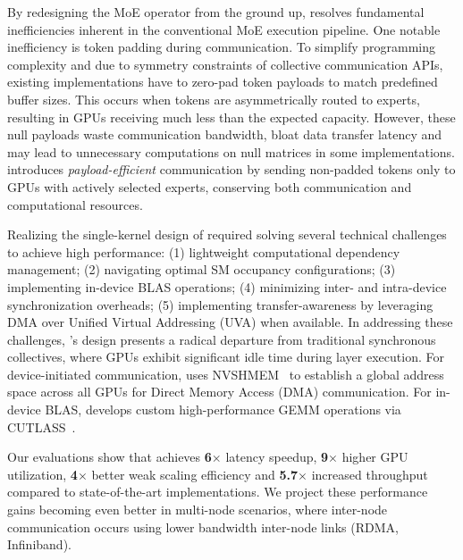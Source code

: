 By redesigning the MoE operator from the ground up,
\sysname resolves fundamental inefficiencies inherent in the conventional MoE execution pipeline. One notable inefficiency is token padding during communication.
To simplify programming complexity and due to symmetry constraints of collective communication APIs, existing implementations have to zero-pad token payloads to match predefined buffer sizes. This occurs when tokens are asymmetrically routed to experts, resulting in GPUs receiving much less than the expected capacity.
However, these null payloads waste communication bandwidth, bloat data transfer latency and may lead to
unnecessary computations on null matrices in some implementations. \sysname introduces \emph{payload-efficient} communication by sending non-padded tokens only to GPUs with actively selected experts, conserving both communication and computational resources.

Realizing the single-kernel design of \sysname required
solving several technical challenges to achieve high performance: (1) lightweight computational dependency management; (2) navigating optimal SM occupancy configurations; (3) implementing in-device BLAS operations; (4) minimizing inter- and intra-device synchronization overheads; (5) implementing transfer-awareness by leveraging DMA over Unified Virtual Addressing (UVA) when available. In addressing these challenges, \sysname's design presents a radical departure from traditional synchronous \alltoall collectives, where GPUs exhibit significant idle time during layer execution. For device-initiated communication, \sysname uses NVSHMEM~\cite{nvshm} to establish a global address space across all GPUs for Direct Memory Access (DMA) communication. For in-device BLAS, \sysname develops custom high-performance GEMM operations via CUTLASS~\cite{Thakkar_CUTLASS_2023}.

Our evaluations show that \sysname achieves \textbf{6}$\times$ latency speedup,
\textbf{9}$\times$ higher GPU utilization, \textbf{4}$\times$ better weak scaling efficiency and \textbf{5.7}$\times$
increased throughput compared to state-of-the-art implementations.
We project these performance gains becoming even better in multi-node scenarios,
where inter-node communication occurs using lower bandwidth inter-node links (\eg RDMA, Infiniband).

